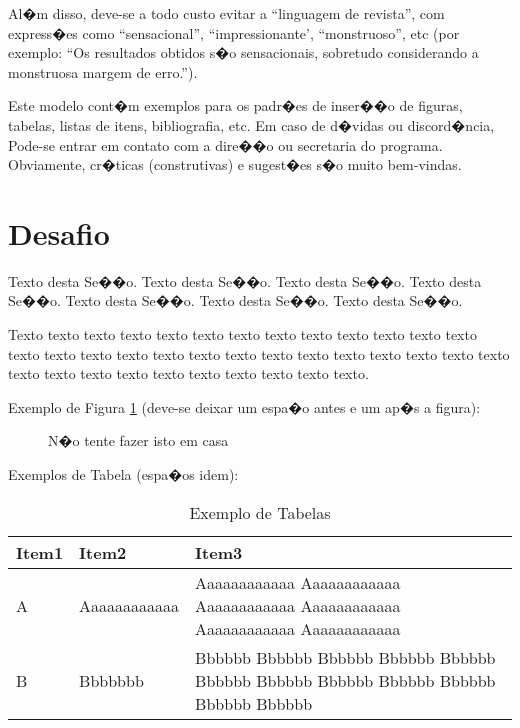 \documentclass[msc, oneside]{ppgiathesis}
\begin{document}
Al�m disso, deve-se a todo custo evitar a ``linguagem  de
revista'', com express�es como ``sensacional'', ``impressionante',
``monstruoso'', etc (por exemplo: ``Os resultados obtidos s�o
sensacionais, sobretudo considerando a monstruosa margem de
erro.'').

Este modelo cont�m exemplos para os padr�es de inser��o de
figuras, tabelas, listas de itens, bibliografia, etc. Em caso de
d�vidas ou discord�ncia, Pode-se entrar em contato com a dire��o
ou secretaria do programa. Obviamente, cr�ticas (construtivas) e
sugest�es s�o muito bem-vindas.

\section{Desafio}

Texto desta Se��o. Texto desta Se��o. Texto desta Se��o. Texto
desta Se��o. Texto desta Se��o. Texto desta Se��o. Texto desta
Se��o.

Texto texto texto texto texto texto texto texto texto texto texto
texto texto texto texto texto texto texto texto texto texto texto
texto texto texto texto texto texto texto texto texto texto texto
texto texto texto texto.

Exemplo de Figura \ref{fig_1} (deve-se deixar um espa�o antes e um
ap�s a figura):

\begin{figure}[hbt!]
  \begin{center}
    \caption{N�o tente fazer isto em casa}
    \label{fig_1}
  \end{center}
\end{figure}

Exemplos de Tabela (espa�os idem):

\begin{center}
  \begin{table}[htb!]
    \caption{Exemplo de Tabelas}
    \begin{tabular}{|l|p{3in}|p{2.3in}|}
      \hline
      \textbf{Item1} & \textbf{Item2} & \textbf{Item3} \\
      \hline
        A & Aaaaaaaaaaaa & Aaaaaaaaaaaa Aaaaaaaaaaaa Aaaaaaaaaaaa Aaaaaaaaaaaa Aaaaaaaaaaaa Aaaaaaaaaaaa \\
      \hline
    B & Bbbbbbb & Bbbbbb Bbbbbb Bbbbbb Bbbbbb Bbbbbb Bbbbbb Bbbbbb Bbbbbb Bbbbbb Bbbbbb Bbbbbb Bbbbbb \\
      \hline
    \end{tabular}
    \label{tab_smtp_comand}
  \end{table}
\end{center}
\end{document}
